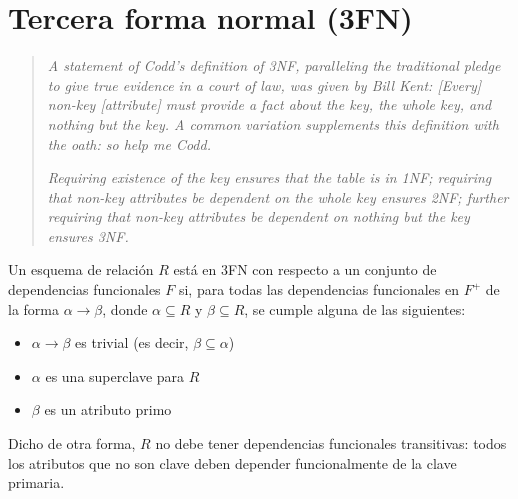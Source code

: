 \documentclass[a4paper, twoside]{article}
\begin{document}
\section{Tercera forma normal (3FN)}
\begin{quote}
\emph{A statement of Codd's definition of 3NF, paralleling the traditional
pledge to give true evidence in a court of law, was given by Bill
Kent: {[}Every{]} non-key {[}attribute{]} must provide
a fact about the key, the whole key, and nothing but the key.
A common variation supplements this definition with the oath: so
help me Codd.}

\emph{Requiring existence of the key
ensures that the table is in 1NF; requiring that non-key attributes
be dependent on the whole key ensures
2NF; further requiring that non-key attributes be dependent on nothing
but the key ensures 3NF.}
\end{quote}
Un esquema de relación $R$ está en 3FN con respecto a un conjunto
de dependencias funcionales $F$ si, para todas las dependencias funcionales
en $F^{+}$ de la forma $\alpha\to\beta$, donde $\alpha\subseteq R$
y $\beta\subseteq R$, se cumple alguna de las siguientes:
\begin{itemize}
\item $\alpha\to\beta$ es trivial (es decir, $\beta\subseteq\alpha$)
\item $\alpha$ es una superclave para $R$ 
\item $\beta$ es un atributo primo
\end{itemize}
Dicho de otra forma, $R$ no debe tener dependencias funcionales transitivas:
todos los atributos que no son clave deben depender funcionalmente
de la clave primaria.
\end{document}
